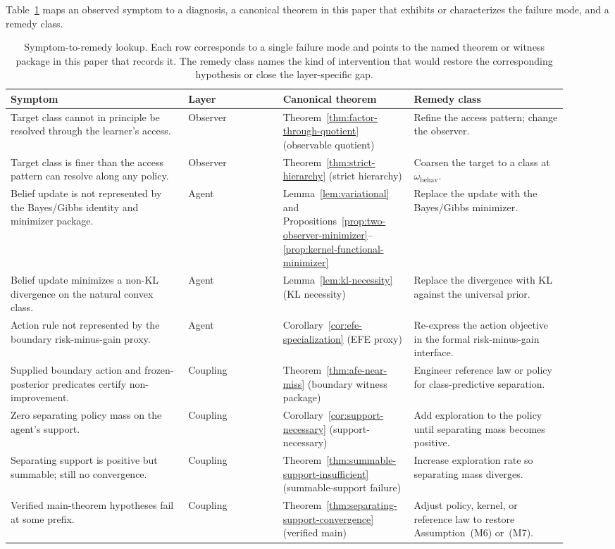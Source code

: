 \documentclass[11pt]{article}
\theoremstyle{definition}
\theoremstyle{remark}
\theoremstyle{plain}
\theoremstyle{definition}
\begin{document}
Table~\ref{tab:diagnostic} maps an observed symptom to a diagnosis, a canonical theorem in this paper that exhibits or characterizes the failure mode, and a remedy class.

\begin{table}[h]
\centering\small
\renewcommand{\arraystretch}{1.25}
\begin{tabular}{p{0.30\linewidth}p{0.16\linewidth}p{0.20\linewidth}p{0.26\linewidth}}
\toprule
Symptom & Layer & Canonical theorem & Remedy class \\
\midrule
Target class cannot in principle be resolved through the learner's access. & Observer & Theorem~\ref{thm:factor-through-quotient} (observable quotient) & Refine the access pattern; change the observer. \\
Target class is finer than the access pattern can resolve along any policy. & Observer & Theorem~\ref{thm:strict-hierarchy} (strict hierarchy) & Coarsen the target to a class at $\omega_{\mathrm{behav}}$. \\
Belief update is not represented by the Bayes/Gibbs identity and minimizer package. & Agent & Lemma~\ref{lem:variational} and Propositions~\ref{prop:two-observer-minimizer}--\ref{prop:kernel-functional-minimizer} & Replace the update with the Bayes/Gibbs minimizer. \\
Belief update minimizes a non-KL divergence on the natural convex class. & Agent & Lemma~\ref{lem:kl-necessity} (KL necessity) & Replace the divergence with KL against the universal prior. \\
Action rule not represented by the boundary risk-minus-gain proxy. & Agent & Corollary~\ref{cor:efe-specialization} (EFE proxy) & Re-express the action objective in the formal risk-minus-gain interface. \\
Supplied boundary action and frozen-posterior predicates certify non-improvement. & Coupling & Theorem~\ref{thm:afe-near-miss} (boundary witness package) & Engineer reference law or policy for class-predictive separation. \\
Zero separating policy mass on the agent's support. & Coupling & Corollary~\ref{cor:support-necessary} (support-necessary) & Add exploration to the policy until separating mass becomes positive. \\
Separating support is positive but summable; still no convergence. & Coupling & Theorem~\ref{thm:summable-support-insufficient} (summable-support failure) & Increase exploration rate so separating mass diverges. \\
Verified main-theorem hypotheses fail at some prefix. & Coupling & Theorem~\ref{thm:separating-support-convergence} (verified main) & Adjust policy, kernel, or reference law to restore Assumption~\textup{(M6)} or~\textup{(M7)}. \\
\bottomrule
\end{tabular}
\caption{Symptom-to-remedy lookup. Each row corresponds to a single failure mode and points to the named theorem or witness package in this paper that records it. The remedy class names the kind of intervention that would restore the corresponding hypothesis or close the layer-specific gap.}
\label{tab:diagnostic}
\end{table}
\end{document}
